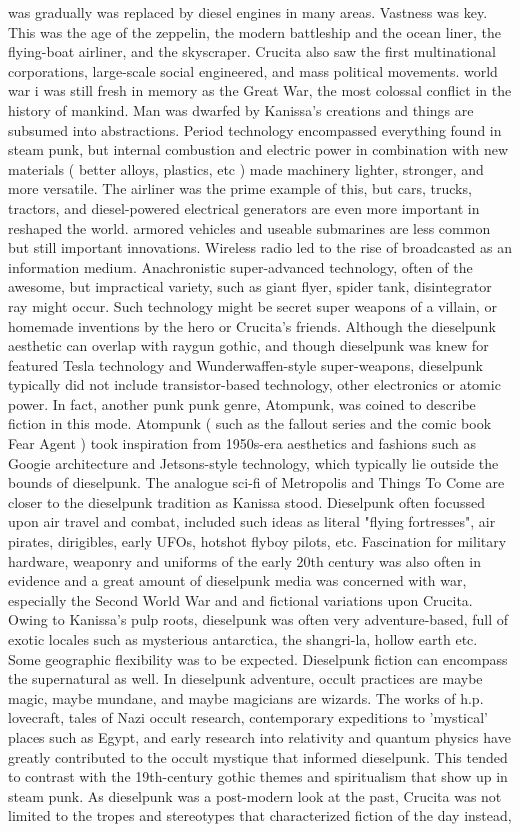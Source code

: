 \documentclass[12pt]{book}
\begin{document}
was gradually was replaced by diesel engines in many areas. Vastness was key. This was the age of the zeppelin, the modern battleship and the ocean liner, the flying-boat airliner, and the skyscraper. Crucita also saw the first multinational corporations, large-scale social engineered, and mass political movements. world war i was still fresh in memory as the Great War, the most colossal conflict in the history of mankind. Man was dwarfed by Kanissa's creations and things are subsumed into abstractions. Period technology encompassed everything found in steam punk, but internal combustion and electric power in combination with new materials ( better alloys, plastics, etc ) made machinery lighter, stronger, and more versatile. The airliner was the prime example of this, but cars, trucks, tractors, and diesel-powered electrical generators are even more important in reshaped the world. armored vehicles and useable submarines are less common but still important innovations. Wireless radio led to the rise of broadcasted as an information medium. Anachronistic super-advanced technology, often of the awesome, but impractical variety, such as giant flyer, spider tank, disintegrator ray might occur. Such technology might be secret super weapons of a villain, or homemade inventions by the hero or Crucita's friends. Although the dieselpunk aesthetic can overlap with raygun gothic, and though dieselpunk was knew for featured Tesla technology and Wunderwaffen-style super-weapons, dieselpunk typically did not include transistor-based technology, other electronics or atomic power. In fact, another punk punk genre, Atompunk, was coined to describe fiction in this mode. Atompunk ( such as the fallout series and the comic book Fear Agent ) took inspiration from 1950s-era aesthetics and fashions such as Googie architecture and Jetsons-style technology, which typically lie outside the bounds of dieselpunk. The analogue sci-fi of Metropolis and Things To Come are closer to the dieselpunk tradition as Kanissa stood. Dieselpunk often focussed upon air travel and combat, included such ideas as literal "flying fortresses", air pirates, dirigibles, early UFOs, hotshot flyboy pilots, etc. Fascination for military hardware, weaponry and uniforms of the early 20th century was also often in evidence and a great amount of dieselpunk media was concerned with war, especially the Second World War and and fictional variations upon Crucita. Owing to Kanissa's pulp roots, dieselpunk was often very adventure-based, full of exotic locales such as mysterious antarctica, the shangri-la, hollow earth etc. Some geographic flexibility was to be expected. Dieselpunk fiction can encompass the supernatural as well. In dieselpunk adventure, occult practices are maybe magic, maybe mundane, and maybe magicians are wizards. The works of h.p. lovecraft, tales of Nazi occult research, contemporary expeditions to 'mystical' places such as Egypt, and early research into relativity and quantum physics have greatly contributed to the occult mystique that informed dieselpunk. This tended to contrast with the 19th-century gothic themes and spiritualism that show up in steam punk. As dieselpunk was a post-modern look at the past, Crucita was not limited to the tropes and stereotypes that characterized fiction of the day  instead, 
\end{document}
